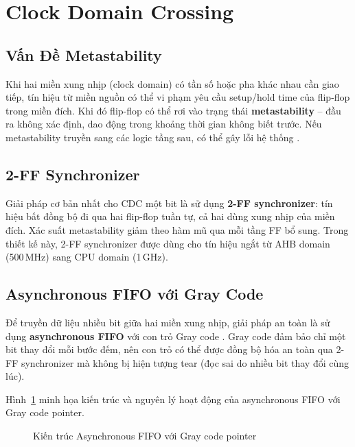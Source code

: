 \section{Clock Domain Crossing}

\subsection{Vấn Đề Metastability}

Khi hai miền xung nhịp (clock domain) có tần số hoặc pha khác nhau cần giao tiếp, tín hiệu từ miền nguồn có thể vi phạm yêu cầu setup/hold time của flip-flop trong miền đích. Khi đó flip-flop có thể rơi vào trạng thái \textbf{metastability} -- đầu ra không xác định, dao động trong khoảng thời gian không biết trước. Nếu metastability truyền sang các logic tầng sau, có thể gây lỗi hệ thống \cite{cummings-cdc}.

\subsection{2-FF Synchronizer}

Giải pháp cơ bản nhất cho CDC một bit là sử dụng \textbf{2-FF synchronizer}: tín hiệu bất đồng bộ đi qua hai flip-flop tuần tự, cả hai dùng xung nhịp của miền đích. Xác suất metastability giảm theo hàm mũ qua mỗi tầng FF bổ sung. Trong thiết kế này, 2-FF synchronizer được dùng cho tín hiệu ngắt từ AHB domain (500\,MHz) sang CPU domain (1\,GHz).

\subsection{Asynchronous FIFO với Gray Code}

Để truyền dữ liệu nhiều bit giữa hai miền xung nhịp, giải pháp an toàn là sử dụng \textbf{asynchronous FIFO} với con trỏ Gray code \cite{cummings-cdc}. Gray code đảm bảo chỉ một bit thay đổi mỗi bước đếm, nên con trỏ có thể được đồng bộ hóa an toàn qua 2-FF synchronizer mà không bị hiện tượng tear (đọc sai do nhiều bit thay đổi cùng lúc).

Hình~\ref{fig:async-fifo} minh họa kiến trúc và nguyên lý hoạt động của asynchronous FIFO với Gray code pointer.

\begin{figure}[htp]
\centering
{}
\caption{Kiến trúc Asynchronous FIFO với Gray code pointer}
\label{fig:async-fifo}
\end{figure}

